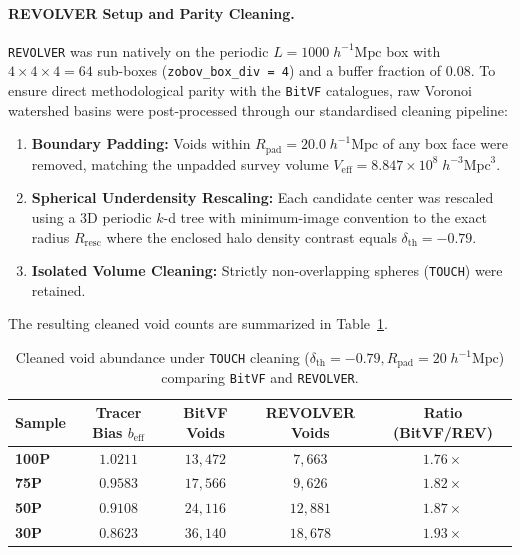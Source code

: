\documentclass[12pt]{report}
\begin{document}
\paragraph{REVOLVER Setup and Parity Cleaning.}
\texttt{REVOLVER} was run natively on the periodic $L = 1000\;h^{-1}\mathrm{Mpc}$ box with $4 \times 4 \times 4 = 64$ sub-boxes (\texttt{zobov\_box\_div = 4}) and a buffer fraction of $0.08$. To ensure direct methodological parity with the \texttt{BitVF} catalogues, raw Voronoi watershed basins were post-processed through our standardised cleaning pipeline:
\begin{enumerate}
    \item \textbf{Boundary Padding:} Voids within $R_{\mathrm{pad}} = 20.0\;h^{-1}\mathrm{Mpc}$ of any box face were removed, matching the unpadded survey volume $V_{\mathrm{eff}} = 8.847 \times 10^8\;h^{-3}\mathrm{Mpc}^3$.
    \item \textbf{Spherical Underdensity Rescaling:} Each candidate center was rescaled using a 3D periodic $k$-d tree with minimum-image convention to the exact radius $R_{\mathrm{resc}}$ where the enclosed halo density contrast equals $\delta_{\mathrm{th}} = -0.79$.
    \item \textbf{Isolated Volume Cleaning:} Strictly non-overlapping spheres (\texttt{TOUCH}) were retained.
\end{enumerate}

The resulting cleaned void counts are summarized in Table~\ref{tab:finder_counts_comparison}.

\begin{table}[H]
    \centering
    \caption{Cleaned void abundance under \texttt{TOUCH} cleaning ($\delta_{\mathrm{th}} = -0.79, R_{\mathrm{pad}} = 20\;h^{-1}\mathrm{Mpc}$) comparing \texttt{BitVF} and \texttt{REVOLVER}.}
    \label{tab:finder_counts_comparison}
    \begin{tabular}{lcccc}
        \toprule
        \textbf{Sample} & \textbf{Tracer Bias $b_{\mathrm{eff}}$} & \textbf{BitVF Voids} & \textbf{REVOLVER Voids} & \textbf{Ratio (BitVF/REV)} \\
        \midrule
        \textbf{100P} & $1.0211$ & $13,472$ & $7,663$  & $1.76\times$ \\
        \textbf{75P}  & $0.9583$ & $17,566$ & $9,626$  & $1.82\times$ \\
        \textbf{50P}  & $0.9108$ & $24,116$ & $12,881$ & $1.87\times$ \\
        \textbf{30P}  & $0.8623$ & $36,140$ & $18,678$ & $1.93\times$ \\
        \bottomrule
    \end{tabular}
\end{table}
\end{document}
